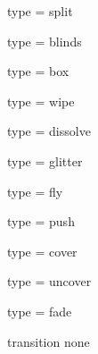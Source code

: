     type = split\par
{}   type = blinds\par
{}      type = box\par
{}     type = wipe\par
{} type = dissolve\par
{}  type = glitter\par
{}      type = fly\par
{}     type = push\par
{}    type = cover\par
{}  type = uncover\par
{}     type = fade\par
\restrictallattributes transition none\par

\endinput